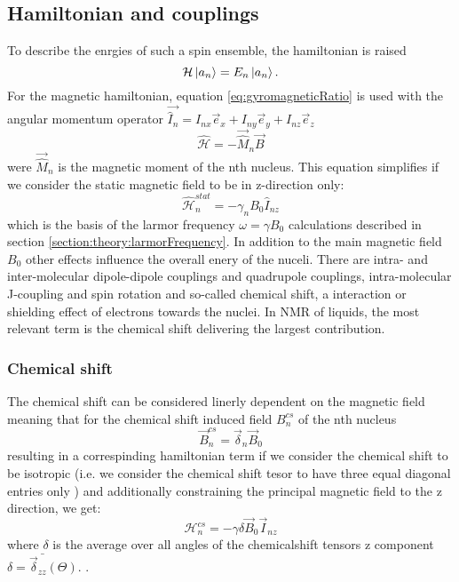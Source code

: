         \subsection{Hamiltonian and couplings}
            To describe the enrgies of such a spin ensemble, the hamiltonian is raised
            \begin{equation*}
                \mathcal{H}\ket{a_n} = E_n \ket{a_n}.
            \end{equation*}
            For the magnetic hamiltonian, equation \ref{eq:gyromagneticRatio} is used with the angular momentum operator $\vec{\hat I_n} = I_{nx}\vec e_x + I_{ny}\vec e_y + I_{nz}\vec e_z$
            \begin{equation}
                \mathcal{\hat H} = - \vec{\hat M}_n \vec B
            \end{equation}
            were $\vec{\hat M}_n$ is the magnetic moment of the nth nucleus. This equation simplifies if we consider the static magnetic field to be in z-direction only:
            \begin{equation}
                \mathcal{\hat H}_n^{stat} = - \gamma_n B_0 \hat{I}_{nz}
            \end{equation}
            which is the basis of the larmor frequency $\omega = \gamma B_0$ calculations described in section \ref{section:theory:larmorFrequency}.
            In addition to the main magnetic field $B_0$ other effects influence the overall enery of the nuceli. There are intra- and inter-molecular dipole-dipole couplings and quadrupole couplings, intra-molecular J-coupling and spin rotation and so-called chemical shift, a interaction or shielding effect of electrons towards the nuclei.
            In NMR of liquids, the most relevant term is the chemical shift delivering the largest contribution. 
        \subsubsection{Chemical shift}
            The chemical shift can be considered linerly dependent on the magnetic field meaning that for the chemical shift induced field $B_n^{cs}$ of the nth nucleus
            \begin{equation}
                \vec B_n^{cs} = \vec{\delta}_n\vec B_0
            \end{equation}
            resulting in a correspinding hamiltonian term if we consider the chemical shift to be isotropic (i.e. we consider the chemical shift tesor to have three equal diagonal entries only ) and additionally constraining the principal magnetic field to the z direction, we get:
            \begin{equation}
                \mathcal H_n^{cs} = -\gamma \delta\vec B_0 \vec I_{nz}
            \end{equation}
            where $\delta$ is the average over all angles of the chemicalshift tensors z component $\bar{\delta = \vec{ \delta}_{zz}(\Theta)}$. . 

